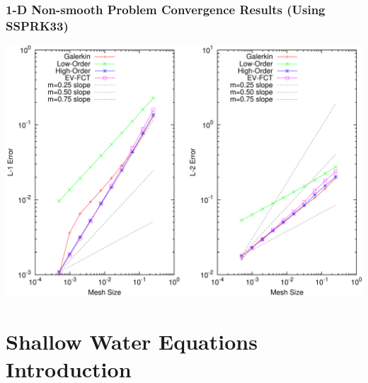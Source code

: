 \documentclass{beamer} \useoutertheme{infolines}
\begin{document}
\begin{frame}
\frametitle{1-D Non-smooth Problem Convergence Results (Using SSPRK33)}

\begin{center}
\includegraphics[height=0.8\textheight]{./figures/convergence_absorber_SSPRK33.pdf}
\end{center}

\end{frame}
\section{Shallow Water Equations Introduction}
\end{document}
